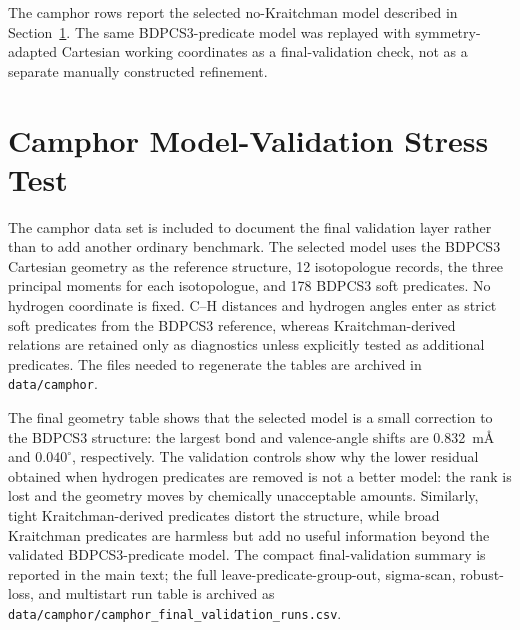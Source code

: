 \documentclass[12pt]{article}
\begin{document}
The camphor rows report the selected no-Kraitchman model described in
Section~\ref{sec:si-camphor}. The same BDPCS3-predicate model was replayed
with symmetry-adapted Cartesian working coordinates as a final-validation
check, not as a separate manually constructed refinement.

\section{Camphor Model-Validation Stress Test}
\label{sec:si-camphor}

The camphor data set is included to document the final validation layer rather
than to add another ordinary benchmark. The selected model uses the BDPCS3
Cartesian geometry as the reference structure, 12 isotopologue records, the
three principal moments for each isotopologue, and 178 BDPCS3 soft predicates.
No hydrogen coordinate is fixed. C--H distances and hydrogen angles enter as
strict soft predicates from the BDPCS3 reference, whereas Kraitchman-derived
relations are retained only as diagnostics unless explicitly tested as
additional predicates. The files needed to regenerate the tables are archived
in \texttt{data/camphor}.







The final geometry table shows that the selected model is a small correction
to the BDPCS3 structure: the largest bond and valence-angle shifts are
0.832~m\AA{} and $0.040^\circ$, respectively. The validation controls show why
the lower residual obtained when hydrogen predicates are removed is not a
better model: the rank is lost and the geometry moves by chemically
unacceptable amounts. Similarly, tight Kraitchman-derived predicates distort
the structure, while broad Kraitchman predicates are harmless but add no
useful information beyond the validated BDPCS3-predicate model. The compact
final-validation summary is reported in the main text; the full
leave-predicate-group-out, sigma-scan, robust-loss, and multistart run table is
archived as \texttt{data/camphor/camphor\_final\_validation\_runs.csv}.

\clearpage
\end{document}
